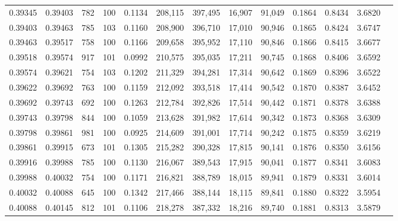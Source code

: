 \begin{tabular}{rrrrrrrrrrrrr}
0.39345 & 0.39403 &   782 & 100 &                                     0.1134 & 208,115 & 397,495 &  16,907 &  91,049 & 0.1864 & 0.8434 & 3.6820 \\
0.39403 & 0.39463 &   785 & 103 &                                     0.1160 & 208,900 & 396,710 &  17,010 &  90,946 & 0.1865 & 0.8424 & 3.6747 \\
0.39463 & 0.39517 &   758 & 100 &                                     0.1166 & 209,658 & 395,952 &  17,110 &  90,846 & 0.1866 & 0.8415 & 3.6677 \\
0.39518 & 0.39574 &   917 & 101 &                                     0.0992 & 210,575 & 395,035 &  17,211 &  90,745 & 0.1868 & 0.8406 & 3.6592 \\
0.39574 & 0.39621 &   754 & 103 &                                     0.1202 & 211,329 & 394,281 &  17,314 &  90,642 & 0.1869 & 0.8396 & 3.6522 \\
0.39622 & 0.39692 &   763 & 100 &                                     0.1159 & 212,092 & 393,518 &  17,414 &  90,542 & 0.1870 & 0.8387 & 3.6452 \\
0.39692 & 0.39743 &   692 & 100 &                                     0.1263 & 212,784 & 392,826 &  17,514 &  90,442 & 0.1871 & 0.8378 & 3.6388 \\
0.39743 & 0.39798 &   844 & 100 &                                     0.1059 & 213,628 & 391,982 &  17,614 &  90,342 & 0.1873 & 0.8368 & 3.6309 \\
0.39798 & 0.39861 &   981 & 100 &                                     0.0925 & 214,609 & 391,001 &  17,714 &  90,242 & 0.1875 & 0.8359 & 3.6219 \\
0.39861 & 0.39915 &   673 & 101 &                                     0.1305 & 215,282 & 390,328 &  17,815 &  90,141 & 0.1876 & 0.8350 & 3.6156 \\
0.39916 & 0.39988 &   785 & 100 &                                     0.1130 & 216,067 & 389,543 &  17,915 &  90,041 & 0.1877 & 0.8341 & 3.6083 \\
0.39988 & 0.40032 &   754 & 100 &                                     0.1171 & 216,821 & 388,789 &  18,015 &  89,941 & 0.1879 & 0.8331 & 3.6014 \\
0.40032 & 0.40088 &   645 & 100 &                                     0.1342 & 217,466 & 388,144 &  18,115 &  89,841 & 0.1880 & 0.8322 & 3.5954 \\
0.40088 & 0.40145 &   812 & 101 &                                     0.1106 & 218,278 & 387,332 &  18,216 &  89,740 & 0.1881 & 0.8313 & 3.5879 \\

\end{tabular}
